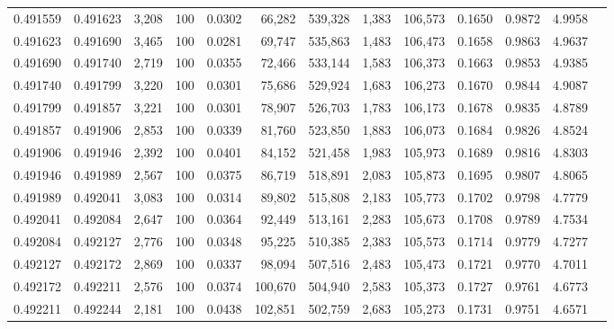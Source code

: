 \begin{tabular}{rrrrrrrrrrrrr}
0.491559 & 0.491623 & 3,208 & 100 &                                     0.0302 &  66,282 & 539,328 &   1,383 & 106,573 & 0.1650 & 0.9872 & 4.9958 \\
0.491623 & 0.491690 & 3,465 & 100 &                                     0.0281 &  69,747 & 535,863 &   1,483 & 106,473 & 0.1658 & 0.9863 & 4.9637 \\
0.491690 & 0.491740 & 2,719 & 100 &                                     0.0355 &  72,466 & 533,144 &   1,583 & 106,373 & 0.1663 & 0.9853 & 4.9385 \\
0.491740 & 0.491799 & 3,220 & 100 &                                     0.0301 &  75,686 & 529,924 &   1,683 & 106,273 & 0.1670 & 0.9844 & 4.9087 \\
0.491799 & 0.491857 & 3,221 & 100 &                                     0.0301 &  78,907 & 526,703 &   1,783 & 106,173 & 0.1678 & 0.9835 & 4.8789 \\
0.491857 & 0.491906 & 2,853 & 100 &                                     0.0339 &  81,760 & 523,850 &   1,883 & 106,073 & 0.1684 & 0.9826 & 4.8524 \\
0.491906 & 0.491946 & 2,392 & 100 &                                     0.0401 &  84,152 & 521,458 &   1,983 & 105,973 & 0.1689 & 0.9816 & 4.8303 \\
0.491946 & 0.491989 & 2,567 & 100 &                                     0.0375 &  86,719 & 518,891 &   2,083 & 105,873 & 0.1695 & 0.9807 & 4.8065 \\
0.491989 & 0.492041 & 3,083 & 100 &                                     0.0314 &  89,802 & 515,808 &   2,183 & 105,773 & 0.1702 & 0.9798 & 4.7779 \\
0.492041 & 0.492084 & 2,647 & 100 &                                     0.0364 &  92,449 & 513,161 &   2,283 & 105,673 & 0.1708 & 0.9789 & 4.7534 \\
0.492084 & 0.492127 & 2,776 & 100 &                                     0.0348 &  95,225 & 510,385 &   2,383 & 105,573 & 0.1714 & 0.9779 & 4.7277 \\
0.492127 & 0.492172 & 2,869 & 100 &                                     0.0337 &  98,094 & 507,516 &   2,483 & 105,473 & 0.1721 & 0.9770 & 4.7011 \\
0.492172 & 0.492211 & 2,576 & 100 &                                     0.0374 & 100,670 & 504,940 &   2,583 & 105,373 & 0.1727 & 0.9761 & 4.6773 \\
0.492211 & 0.492244 & 2,181 & 100 &                                     0.0438 & 102,851 & 502,759 &   2,683 & 105,273 & 0.1731 & 0.9751 & 4.6571 \\

\end{tabular}
